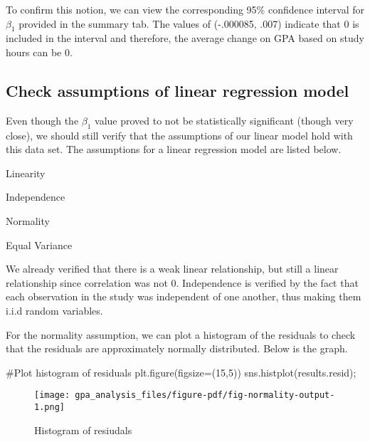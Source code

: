 \documentclass[
  letterpaper,
  DIV=11,
  numbers=noendperiod]{scrreprt}
\newenvironment{Shaded}{\begin{snugshade}}{\end{snugshade}}
\newcommand{\CommentTok}[1]{\textcolor[rgb]{0.37,0.37,0.37}{#1}}
\newcommand{\DecValTok}[1]{\textcolor[rgb]{0.68,0.00,0.00}{#1}}
\newcommand{\NormalTok}[1]{\textcolor[rgb]{0.00,0.23,0.31}{#1}}
\newcommand{\OperatorTok}[1]{\textcolor[rgb]{0.37,0.37,0.37}{#1}}
\begin{document}
To confirm this notion, we can view the corresponding 95\% confidence
interval for \(\beta_1\) provided in the summary tab. The values of
(-.000085, .007) indicate that 0 is included in the interval and
therefore, the average change on GPA based on study hours can be 0.

\hypertarget{check-assumptions-of-linear-regression-model}{%
\subsection{Check assumptions of linear regression
model}\label{check-assumptions-of-linear-regression-model}}

Even though the \(\beta_1\) value proved to not be statistically
significant (though very close), we should still verify that the
assumptions of our linear model hold with this data set. The assumptions
for a linear regression model are listed below.

Linearity

Independence

Normality

Equal Variance

We already verified that there is a weak linear relationship, but still
a linear relationship since correlation was not 0. Independence is
verified by the fact that each observation in the study was independent
of one another, thus making them i.i.d random variables.

For the normality assumption, we can plot a histogram of the residuals
to check that the residuals are approximately normally distributed.
Below is the graph.

\begin{Shaded}
\begin{Highlighting}[]
\CommentTok{\#Plot histogram of residuals}
\NormalTok{plt.figure(figsize}\OperatorTok{=}\NormalTok{(}\DecValTok{15}\NormalTok{,}\DecValTok{5}\NormalTok{))}
\NormalTok{sns.histplot(results.resid)}\OperatorTok{;}
\end{Highlighting}
\end{Shaded}

\begin{figure}[H]

{\centering \texttt{[image: gpa\_analysis\_files/figure-pdf/fig-normality-output-1.png]}

}

\caption{\label{fig-normality}Histogram of resiudals}

\end{figure}
\end{document}
